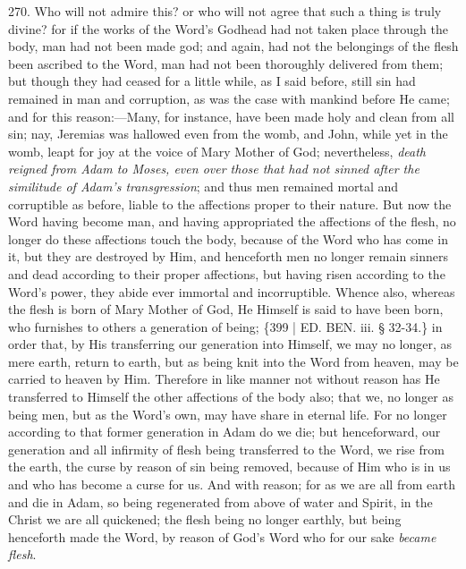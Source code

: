 270.
Who will not admire this? or who will not agree that such a thing is
truly divine? for if the works of the Word's Godhead had not taken
place through the body, man had not been made god; and again, had not
the belongings of the flesh been ascribed to the Word, man had not
been thoroughly delivered from them; but though they had ceased for a
little while, as I said before, still sin had remained in man and
corruption, as was the case with mankind before He came; and for this
reason:—Many, for instance, have been made holy and clean from all
sin; nay, Jeremias was hallowed even from the womb, and John, while
yet in the womb, leapt for joy at the voice of Mary Mother of God;
nevertheless, \emph{death reigned from Adam to Moses, even over those
that had not sinned after the similitude of Adam's transgression};
and thus men remained mortal and corruptible as before, liable to the
affections proper to their nature. But now the Word having become man,
and having appropriated the affections of the flesh, no longer do
these affections touch the body, because of the Word who has come in
it, but they are destroyed by Him, and henceforth men no longer remain
sinners and dead according to their proper affections, but having
risen according to the Word's power, they abide ever immortal and
incorruptible. Whence also, whereas the flesh is born of Mary Mother
of God, He Himself is said to have been born, who furnishes to others
a generation of being; \{399 | ED.
BEN. iii. § 32-34.\} in order that, by His
transferring our generation into Himself, we may no longer, as mere
earth, return to earth, but as being knit into the Word from heaven,
may be carried to heaven by Him. Therefore in like manner not without
reason has He transferred to Himself the other affections of the body
also; that we, no longer as being men, but as the Word's own, may have
share in eternal life. For no longer according to that former
generation in Adam do we die; but henceforward, our generation and all
infirmity of flesh being transferred to the Word, we rise from the
earth, the curse by reason of sin being removed, because of Him who is
in us and who has become a curse for us. And with reason; for as we
are all from earth and die in Adam, so being regenerated from above of
water and Spirit, in the Christ we are all quickened; the flesh being
no longer earthly, but being henceforth made the Word, by reason of
God's Word who for our sake \emph{became flesh}.

